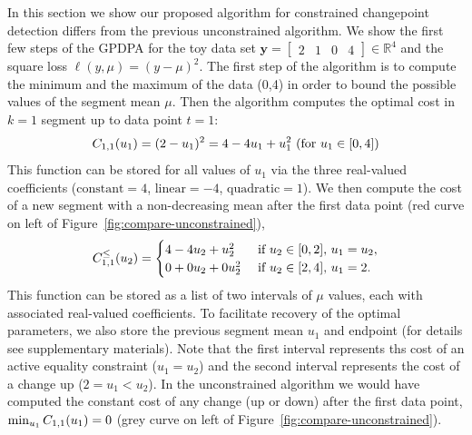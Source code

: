 \documentclass[aoas]{imsart}
\newcommand{\RR}{\mathbb R}
\begin{document}
In this section we show our proposed algorithm for constrained
changepoint detection differs from the previous unconstrained
algorithm. We show the first few steps of the GPDPA for the toy data
set $\mathbf y= \left[
\begin{array}{cccccc}
  2 & 1 & 0 & 4
\end{array}
\right] \in\RR^4$ and the square loss $\ell(y,\mu)=(y-\mu)^2$. The first
step of the algorithm is to compute the minimum and the maximum of the
data (0,4) in order to bound the possible values of the segment
mean $\mu$. Then the algorithm computes the optimal cost in $k=1$ segment up
to data point $t=1$:
\begin{equation}
  \FCC_{1,1}(u_1) = (2-u_1)^2=4 - 4u_1 + u_1^2\text{ (for $u_1\in[0,4]$)}
\end{equation}
This function can be stored for all values of $u_1$ via the three
real-valued coefficients ($\text{constant}=4$, $\text{linear}=-4$,
$\text{quadratic}=1$). We then compute the cost of a new segment with
a non-decreasing mean after the first data point (red curve on left of
Figure~\ref{fig:compare-unconstrained}),
\begin{equation}
  \FCC_{1,1}^\leq(u_2) =
  \begin{cases}
    4 - 4 u_2 + u_2^2 &\text{ if }u_2\in[0,2],\, u_1=u_2,\\
    0 + 0 u_2 + 0 u_2^2 & \text{ if }u_2\in[2,4],\,  u_1=2.
  \end{cases}
\end{equation}
This function can be stored as a list of two intervals of $\mu$
values, each with associated real-valued coefficients. To facilitate
recovery of the optimal parameters, we also store the previous segment
mean $u_1$ and endpoint (for details see supplementary
materials). Note that the first interval represents ths cost of an
active equality constraint ($u_1=u_2$) and the second interval
represents the cost of a change up ($2=u_1<u_2$). In the unconstrained
algorithm we would have computed the constant cost of any change (up
or down) after the first data point, $\min_{u_1} C_{1,1}(u_1) =0$
(grey curve on left of Figure~\ref{fig:compare-unconstrained}).
\end{document}
